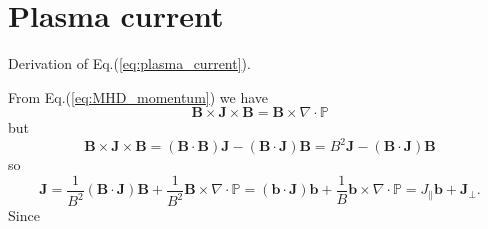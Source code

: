 \section{Plasma current}
Derivation of Eq.(\ref{eq:plasma_current}).
\medskip

From Eq.(\ref{eq:MHD_momentum}) we have
\begin{equation*}
  \mathbf{B}\times\mathbf{J}\times\mathbf{B}=\mathbf{B}\times\nabla\cdot\mathbb{P}
\end{equation*}
but
\begin{equation*}
  \mathbf{B}\times\mathbf{J}\times\mathbf{B}=(\mathbf{B}\cdot\mathbf{B})\mathbf{J}-(\mathbf{B}\cdot\mathbf{J})\mathbf{B}=B^2\mathbf{J}-(\mathbf{B}\cdot\mathbf{J})\mathbf{B}
\end{equation*}
so
\begin{equation*}
  \mathbf{J}=\frac{1}{B^2}(\mathbf{B}\cdot\mathbf{J})\mathbf{B}+\frac{1}{B^2}\mathbf{B}\times\nabla\cdot\mathbb{P}=(\mathbf{b}\cdot\mathbf{J})\mathbf{b}+\frac{1}{B}\mathbf{b}\times\nabla\cdot\mathbb{P}=J_\parallel\mathbf{b}+\mathbf{J}_\perp.
\end{equation*}
Since
